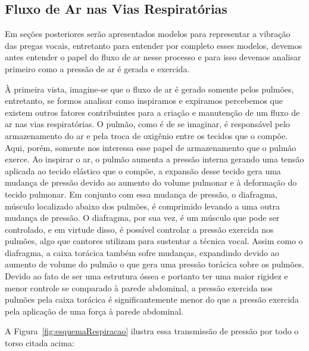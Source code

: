 	\subsection{Fluxo de Ar nas Vias Respiratórias}
	
	Em seções posteriores serão apresentados modelos para representar a vibração das pregas vocais, entretanto para entender por completo esses modelos, devemos antes entender o papel do ﬂuxo de ar nesse processo e para isso devemos analisar primeiro como a pressão de ar é gerada e exercida.
	
	À primeira vista, imagine-se que o ﬂuxo de ar é gerado somente pelos pulmões, entretanto, se formos analisar como inspiramos e expiramos percebemos que existem outros fatores contribuintes para a criação e manutenção de um ﬂuxo de ar nas vias respiratórias. O pulmão, como é de se imaginar, é responsável pelo armazenamento do ar e pela troca de oxigênio entre os tecidos que o compõe. Aqui, porém, somente nos interessa esse papel de armazenamento que o pulmão exerce. Ao inspirar o ar, o pulmão aumenta a pressão interna gerando uma tensão aplicada ao tecido elástico que o compõe, a expansão desse tecido gera uma mudança de pressão devido ao aumento do volume pulmonar e à deformação do tecido pulmonar. Em conjunto com essa mudança de pressão, o diafragma, músculo localizado abaixo dos pulmões, é comprimido levando a uma outra mudança de pressão. O diafragma, por sua vez, é um músculo que pode ser controlado, e em virtude disso, é possível controlar a pressão exercida nos pulmões, algo que cantores utilizam para sustentar a técnica vocal. Assim como o diafragma, a caixa torácica também sofre mudanças, expandindo devido ao aumento de volume do pulmão o que gera uma pressão torácica sobre os pulmões. Devido ao fato de ser uma estrutura óssea e portanto ter uma maior rigidez e menor controle se comparado à parede abdominal, a pressão exercida nos pulmões pela caixa torácica é signiﬁcantemente menor do que a pressão exercida pela aplicação de uma força à parede abdominal.
	
	A Figura~\ref*{fig:esquemaRespiracao} ilustra essa transmissão de pressão por todo o torso citada acima:
	
